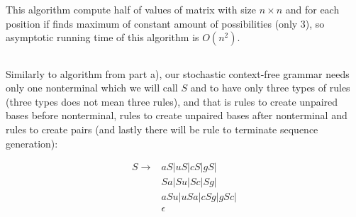 \documentclass[a4paper]{article}
\begin{document}
	
	This algorithm compute half of values of matrix with size $n \times n$ and for each position if finds maximum of constant amount of possibilities (only 3), so asymptotic running time of this algorithm is $O(n^2)$.
	
	\subsection{}
	
	Similarly to algorithm from part a), our stochastic context-free grammar needs only one nonterminal which we will call $S$ and to have only three types of rules (three types does not mean three rules), and that is rules to create unpaired bases before nonterminal, rules to create unpaired bases after nonterminal and rules to create pairs (and lastly there will be rule to terminate sequence generation):
	
	\begin{align*}
		S \rightarrow & aS | uS | cS | gS |
		\\
		&Sa | Su | Sc | Sg | 
		\\
		&aSu | uSa | cSg | gSc |
		\\
		&\epsilon 
	\end{align*}
	
\end{document}
